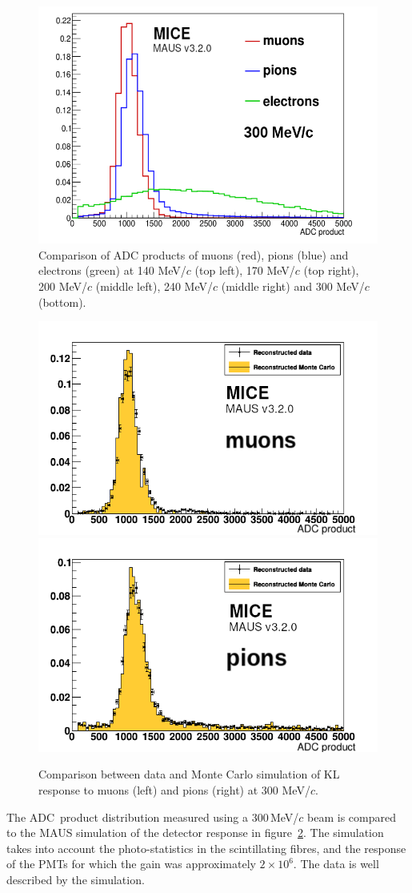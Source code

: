 \begin{figure}
\begin{center}
    \includegraphics[width=0.45\columnwidth]{./04-KL/Figures/mu_vs_pi_vs_e_300MEV-edited.png}
  \end{center}
  \caption{
    Comparison of ADC products of muons (red), pions (blue) and electrons (green) at 140
    MeV/$c$ (top left), 170 MeV/$c$ (top right), 200 MeV/$c$ (middle
    left), 240 MeV/$c$ (middle right) and 300 MeV/$c$ (bottom).
  }
  \label{fig:KL4}
\end{figure}
\begin{figure}
  \begin{center}
    \includegraphics[width=0.4\columnwidth]{./04-KL/Figures/muon_mc_vs_data_edited.png}
    \includegraphics[width=0.4\columnwidth]{./04-KL/Figures/pion_mc_vs_data_edited.png}
  \end{center}
  \caption{
    Comparison between data and Monte Carlo simulation of KL response
    to muons (left) and pions (right) at 300 MeV/$c$.
  } 
  \label{fig:KL_mc_vs_data}
\end{figure}

The ADC~product distribution measured using a 300\,MeV/$c$ beam is
compared to the MAUS simulation of the detector response in
figure~\ref{fig:KL_mc_vs_data}.
The simulation takes into account the photo-statistics in the
scintillating fibres, and the response of the PMTs for which the gain was
approximately $2 \times 10^6$. 
The data is well described by the simulation.
